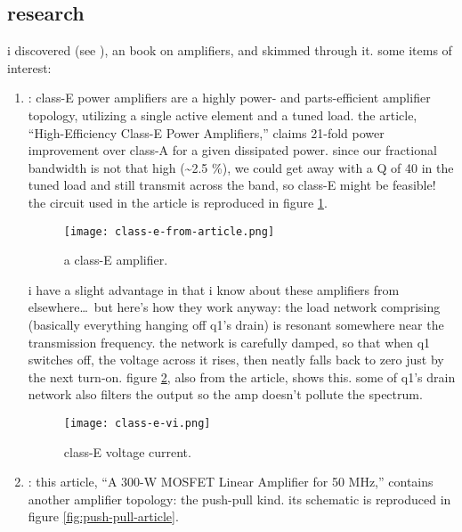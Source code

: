 \subsection*{research}
i discovered \autocite{rf-amp-classics} (see ),
an \arrl book on \rf amplifiers, and skimmed through it. some items of
interest:
\begin{enumerate}
	\item \autocite[p.~1 dash 41]{rf-amp-classics}: class-E power
	amplifiers are a highly power- and parts-efficient amplifier topology,
	utilizing a single active element and a tuned load. the article,
	``High-Efficiency Class-E Power Amplifiers,'' claims 21-fold power
	improvement over class-A for a given dissipated power. since our
	fractional bandwidth is not that high (\textasciitilde 2.5 \%), we
	could get away with a Q of 40 in the tuned load and still transmit
	across the band, so class-E might be feasible! the circuit used in the
	article is reproduced in figure \ref{fig:class-e-from-article}.

	\begin{figure}[H]
		\centering
		\texttt{[image: class-e-from-article.png]}
		\caption{a class-E amplifier.}
		\label{fig:class-e-from-article}
	\end{figure}

	i have a slight advantage in that i know about these amplifiers from
	elsewhere\ldots\ but here's how they work anyway: the load network
	comprising  (basically everything
	hanging off \pr q1's drain) is resonant somewhere near the transmission
	frequency. the network is carefully damped, so that when \pr q1
	switches off, the voltage across it rises, then neatly falls back to
	zero just by the next turn-on. figure \ref{fig:class-e-vi}, also from
	the article, shows this. some of \pr q1's drain network also filters
	the output so the amp doesn't pollute the spectrum.

	\begin{figure}[H]
		\centering
		\texttt{[image: class-e-vi.png]}
		\caption{class-E voltage \amp current.}
		\label{fig:class-e-vi}
	\end{figure}

	\item \autocite[p.~2 dash 5]{rf-amp-classics}: this article, ``A 300-W
	MOSFET Linear Amplifier for 50 MHz,'' contains another amplifier
	topology: the push-pull kind. its schematic is reproduced in figure
	\ref{fig:push-pull-article}.


\end{enumerate}
